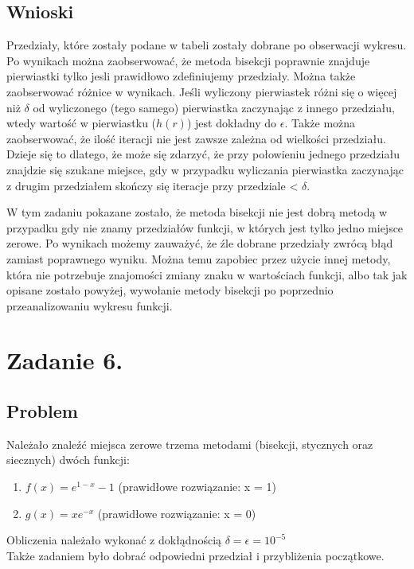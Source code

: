 \documentclass[11pt, a4paper]{article}
\begin{document}
    \subsection{Wnioski}
    Przedziały, które zostały podane w tabeli zostały dobrane po obserwacji wykresu. Po wynikach można zaobserwować, że metoda bisekcji poprawnie znajduje pierwiastki tylko jesli prawidłowo zdefiniujemy przedziały. Można także zaobserwować różnice w wynikach. Jeśli wyliczony pierwiastek różni się o więcej niż $\delta$ od wyliczonego (tego samego) pierwiastka zaczynając z innego przedziału, wtedy wartość w pierwiastku ($h(r)$) jest dokładny do $\epsilon$. Także można zaobserwować, że ilość iteracji nie jest zawsze zależna od wielkości przedziału. Dzieje się to dlatego, że może się zdarzyć, że przy połowieniu jednego przedziału znajdzie się szukane miejsce, gdy w przypadku wyliczania pierwiastka zaczynając z drugim przedziałem skończy się iteracje przy przedziale < $\delta$. 

    W tym zadaniu pokazane zostało, że metoda bisekcji nie jest dobrą metodą w przypadku gdy nie znamy przedziałów funkcji, w których jest tylko jedno miejsce zerowe. Po wynikach możemy zauważyć, że źle dobrane przedziały zwrócą błąd zamiast poprawnego wyniku. Można temu zapobiec przez użycie innej metody, która nie potrzebuje znajomości zmiany znaku w wartościach funkcji, albo tak jak opisane zostało powyżej, wywołanie metody bisekcji po poprzednio przeanalizowaniu wykresu funkcji.

    \section{Zadanie 6.}
    \subsection{Problem}
    Należało znaleźć miejsca zerowe trzema metodami (bisekcji, stycznych oraz siecznych) dwóch funkcji:
    \begin{enumerate}
        \item $f(x) = e^{1-x} - 1$ (prawidłowe rozwiązanie: x = 1)
        \item $g(x) = xe^{-x}$ (prawidłowe rozwiązanie: x = 0)
    \end{enumerate}
    Obliczenia należało wykonać z dokłądnością $\delta = \epsilon = 10^{-5}$\\
    Także zadaniem było dobrać odpowiedni przedział i przybliżenia początkowe.
\end{document}
